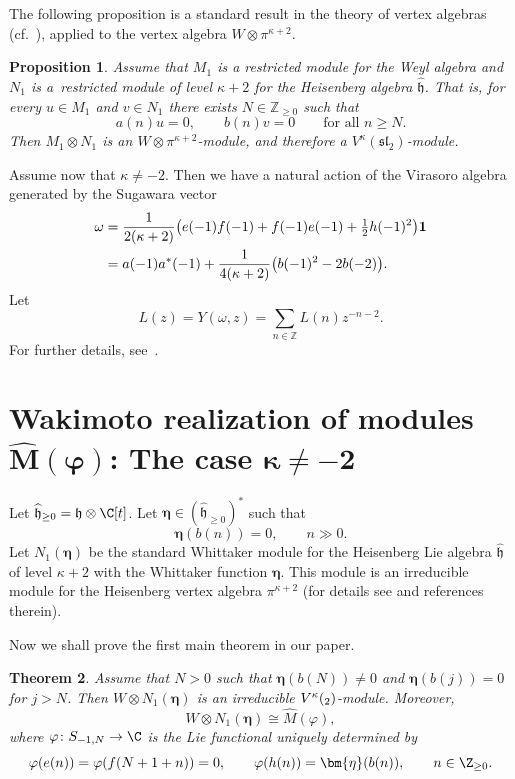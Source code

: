 \documentclass[10pt,a4paper]{amsart}
\numberwithin{equation}{section}
\newtheorem{Theorem}{Theorem}[section]
\newtheorem{Proposition}[Theorem]{Proposition}
\theoremstyle{definition}
\newcommand{\1}{\textbf{1}}
\begin{document}
The following proposition is a standard result in the theory of vertex algebras
(cf.~\cite{FB, K2, LL}), applied to the vertex algebra $W \otimes \pi^{\kappa+2}$.

\begin{Proposition}\label{constr-new1}
Assume that $M_{1}$ is a restricted module for the Weyl algebra and $N_{1}$ is a~restricted module of level $\kappa+2$ for the Heisenberg algebra $\widehat{\mathfrak{h}}$.
That is, for every $u \in M_{1}$ and $v \in N_{1}$ there exists $N \in \mathbb{Z}_{\ge 0}$ such that
\[
 a(n)u = 0, \qquad b(n)v = 0 \qquad \text{for all } n \ge N.
\]
Then $M_{1} \otimes N_{1}$ is an $W \otimes \pi^{\kappa+2}$-module, and therefore a
$V^{\kappa}(\mathfrak{sl}_{2})$-module.
\end{Proposition}

Assume now that $\kappa \ne -2$.
Then we have a natural action of the Virasoro algebra generated by the Sugawara vector
\begin{align*}
 \omega
 &= \frac{1}{2(\kappa + 2)}
 \big( e(-1)f(-1) + f(-1)e(-1) + \tfrac{1}{2}h(-1)^{2} \big){\bf 1} \\
 &= a(-1)a^{*}(-1)
 + \frac{1}{4(\kappa + 2)} \big( b(-1)^{2} - 2b(-2) \big).
\end{align*}
Let
\[
 L(z) = Y(\omega, z) = \sum_{n \in \mathbb{Z}} L(n) z^{-n-2}.
\]
For further details, see~\cite{FB}.

\section[Wakimoto realization of modules widehat M(varphi): The case kappa not = -2]{Wakimoto realization of modules $\boldsymbol{\widehat M(\varphi)}$: The case $\boldsymbol{\kappa \ne -2}$}

Let $\widehat{\mathfrak h}_{\ge 0} = {\mathfrak h} \otimes {\C}[t]$. Let $\bm{\eta} \in (\widehat{\mathfrak h}_{\ge 0}) ^* $ such that
 \[ \bm{\eta}(b (n)) = 0, \qquad n \gg 0. \]
Let $N_1 (\bm{\eta}) $ be the standard Whittaker module for the Heisenberg Lie algebra $\widehat{\mathfrak h}$ of level $\kappa +2$ with the Whittaker function $\bm{\eta}$. This module is an irreducible module for the Heisenberg vertex algebra $\pi^{\kappa+2}$ (for details see \cite{ALPY} and references therein).


Now we shall prove the first main theorem in our paper.



\begin{Theorem} \label{prvi-teorem} Assume that $N >0$ such that $\bm{\eta}(b(N)) \ne 0$ and $\bm{\eta}(b(j)) =0$ for $j >N$.
Then $W \otimes N_1(\bm{\eta})$ is an irreducible $V^{\kappa}(\sl_2)$-module. Moreover,
 \[ W \otimes N_1(\bm{\eta}) \cong \widehat{M}(\varphi), \]
where $\varphi \colon S_{-1, N} \rightarrow \C$ is the Lie functional uniquely determined by
 \[ \varphi(e(n)) = \varphi(f(N+1+n)) = 0, \qquad \varphi(h(n)) = \bm{\eta}(b(n)), \qquad n \in {\Z}_{\ge 0}. \]
\end{Theorem}
\end{document}
